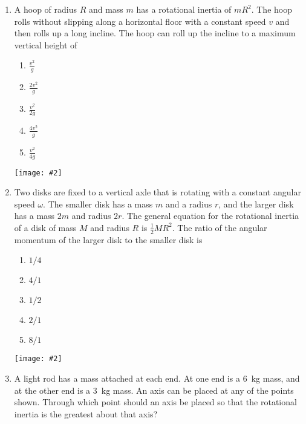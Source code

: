 \documentclass[12pt]{article}
\newcommand{\pic}[2]{\texttt{[image: \#2]}}
\begin{document}
\begin{enumerate}[leftmargin=50pt,label=\underline{\hspace{0.4in}} \arabic*]
\item A hoop of radius $R$ and mass $m$ has a rotational inertia of $mR^2$. The
  hoop rolls without slipping along a horizontal floor with a constant
  speed $v$ and then rolls up a long incline. The hoop can roll up the
  incline to a maximum vertical height of
  
  \begin{minipage}{0.3\textwidth}
    \begin{enumerate}[noitemsep,topsep=0pt]
    \item$\displaystyle \frac{v^2}{g}$
    \item$\displaystyle \frac{2v^2}{g}$
    \item$\displaystyle \frac{v^2}{2g}$
    \item$\displaystyle \frac{4v^2}{g}$
    \item$\displaystyle \frac{v^2}{4g}$
    \end{enumerate}
  \end{minipage}
  \begin{minipage}{0.6\textwidth}
    \pic{.9}{hoop1.png}
  \end{minipage}

\item Two disks are fixed to a vertical axle that is rotating with a constant
  angular speed $\omega$. The smaller disk has a mass $m$ and a radius $r$, and
  the larger disk has a mass $2m$ and radius $2r$. The general equation for the
  rotational inertia of a disk of mass $M$ and radius $R$ is $\frac{1}{2}MR^2$.
  The ratio of the angular momentum of the larger disk to the smaller disk is\\
  \begin{minipage}{0.3\textwidth}
    \begin{enumerate}[noitemsep,topsep=0pt]
    \item$1/4$
    \item$4/1$
    \item$1/2$
    \item$2/1$
    \item$8/1$
    \end{enumerate}
  \end{minipage}
  \begin{minipage}{0.6\textwidth}
    \pic{.5}{2disks.png}
  \end{minipage}
  
\item A light rod has a mass attached at each end. At one end is a \SI{6}{\kg}
  mass, and at the other end is a \SI{3}{\kg} mass. An axis can be placed at
  any of the points shown. Through which point should an axis be placed so that
  the rotational inertia is the greatest about that axis?
  

\end{enumerate}
\end{document}
